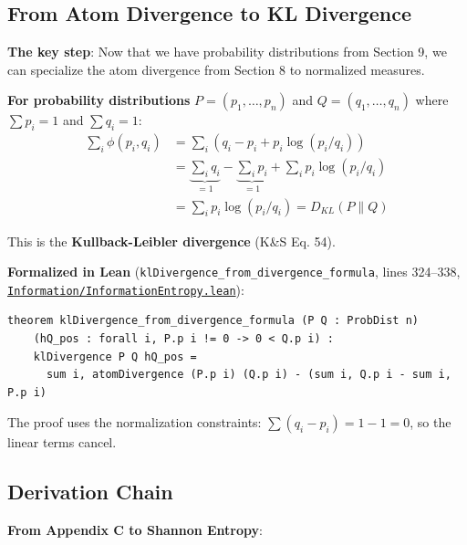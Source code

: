 \documentclass[11pt]{article}
\theoremstyle{definition}
\theoremstyle{remark}
\begin{document}
\subsection{From Atom Divergence to KL Divergence}

\textbf{The key step}: Now that we have probability distributions from Section 9, we can specialize the atom divergence from Section 8 to normalized measures.

\textbf{For probability distributions} $P = (p_1, \ldots, p_n)$ and $Q = (q_1, \ldots, q_n)$ where $\sum p_i = 1$ and $\sum q_i = 1$:
\begin{align*}
\sum_i \phi(p_i, q_i) &= \sum_i (q_i - p_i + p_i \log(p_i/q_i)) \\
&= \underbrace{\sum_i q_i}_{=1} - \underbrace{\sum_i p_i}_{=1} + \sum_i p_i \log(p_i/q_i) \\
&= \sum_i p_i \log(p_i/q_i) = D_{KL}(P \| Q)
\end{align*}

This is the \textbf{Kullback-Leibler divergence} (K\&S Eq. 54).

\textbf{Formalized in Lean} (\texttt{klDivergence\_from\_divergence\_formula}, lines 324--338,
\href{https://github.com/zariuq/ks-foundations-of-inference/blob/main/KnuthSkilling/Information/InformationEntropy.lean}{\texttt{Information/InformationEntropy.lean}}):
\begin{lstlisting}
theorem klDivergence_from_divergence_formula (P Q : ProbDist n)
    (hQ_pos : forall i, P.p i != 0 -> 0 < Q.p i) :
    klDivergence P Q hQ_pos =
      sum i, atomDivergence (P.p i) (Q.p i) - (sum i, Q.p i - sum i, P.p i)
\end{lstlisting}

The proof uses the normalization constraints: $\sum (q_i - p_i) = 1 - 1 = 0$, so the linear terms cancel.

\subsection{Derivation Chain}

\textbf{From Appendix C to Shannon Entropy}:
\end{document}
